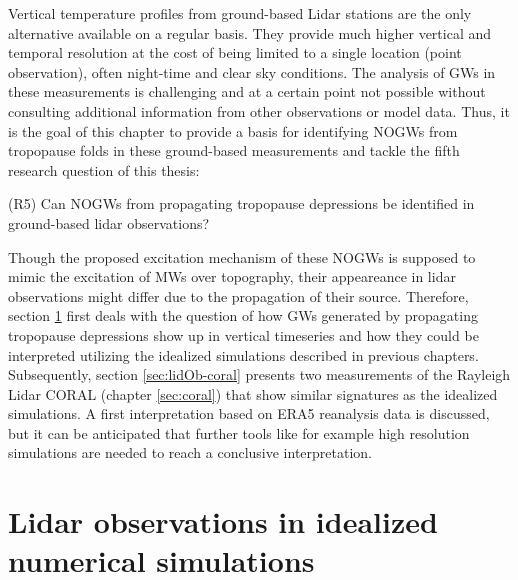 Vertical temperature profiles from ground-based Lidar stations are the only alternative available on a regular basis. They provide much higher vertical and temporal resolution at the cost of being limited to a single location (point observation), often night-time and clear sky conditions. The analysis of GWs in these measurements is challenging and at a certain point not possible without consulting additional information from other observations or model data. Thus, it is the goal of this chapter to provide a basis for identifying NOGWs from tropopause folds in these ground-based measurements and tackle the fifth research question of this thesis:
%
\begin{tcolorbox}[]
    (R5) Can NOGWs from propagating tropopause depressions be identified in ground-based lidar observations?
\end{tcolorbox}
Though the proposed excitation mechanism of these NOGWs is supposed to mimic the excitation of MWs over topography, their appeareance in lidar observations might differ due to the propagation of their source. Therefore, section \ref{sec:lidOb-idealized} first deals with the question of how GWs generated by propagating tropopause depressions show up in vertical timeseries and how they could be interpreted utilizing the idealized simulations described in previous chapters.
Subsequently, section \ref{sec:lidOb-coral} presents two measurements of the Rayleigh Lidar CORAL (chapter \ref{sec:coral}) that show similar signatures as the idealized simulations. A first interpretation based on ERA5 reanalysis data is discussed, but it can be anticipated that further tools like for example high resolution simulations are needed to reach a conclusive interpretation. 

\section{Lidar observations in idealized numerical simulations}
\label{sec:lidOb-idealized}


